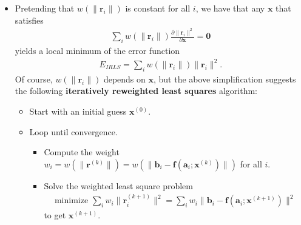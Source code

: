 \documentclass[10pt]{article}
\newcommand{\ve}[1]{\mathbf{#1}}
\begin{document}
\begin{itemize}
    \item Pretending that $w(\| \ve{r}_i \|)$ is constant for all
      $i$, we have that any $\ve{x}$ that satisfies
      \begin{align*}
        \sum_i w(\| \ve{r}_i \|)
          \frac{\partial \| \ve{r}_i \|^2 }{\partial \ve{x}} = \ve{0}
      \end{align*}
      yields a local minimum of the error function
      \begin{align*}
        E_{IRLS} = \sum_i w(\| \ve{r}_i \|) \| \ve{r}_i \|^2.
      \end{align*}
      Of course, $w(\| \ve{r}_i \|)$ depends on $\ve{x}$, but the
      above simplification suggests the following 
      {\bf iteratively reweighted least squares} algorithm:
      \begin{itemize}
        \item Start with an initial guess $\ve{x}^{(0)}$.
        \item Loop until convergence.
        \begin{itemize}
          \item Compute the weight 
            $w_i = w(\| \ve{r}^{(k)} \| ) = w(\| \ve{b}_i - \ve{f}(\ve{a}_i; \ve{x}^{(k)}) \|)$ for all $i$.
          \item Solve the weighted least square problem
            \begin{align*}
              \mbox{minimize }\sum_i w_i \| \ve{r}_i^{(k+1)} \|^2
              = \sum_i w_i \| \ve{b}_i - \ve{f}(\ve{a}_i; \ve{x}^{(k+1)}) \|^2
            \end{align*}
            to get $\ve{x}^{(k+1)}.$
        \end{itemize}
      \end{itemize}
            

\end{itemize}
\end{document}
